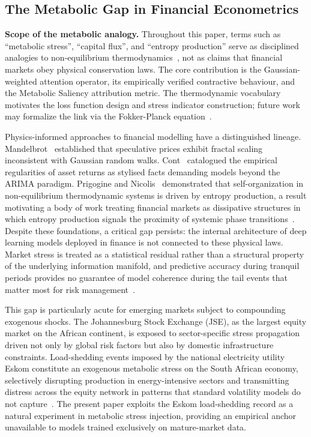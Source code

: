 \documentclass[11pt,a4paper]{article}  %
\theoremstyle{plain}
\theoremstyle{definition}
\theoremstyle{remark}
\begin{document}
\subsection{The Metabolic Gap in Financial Econometrics}
\label{subsec:gap}

\noindent\textbf{Scope of the metabolic analogy.}
Throughout this paper, terms such as ``metabolic stress'',
``capital flux'', and ``entropy production'' serve as disciplined
analogies to non-equilibrium thermodynamics~\cite{Prigogine1977},
not as claims that financial markets obey physical conservation laws.
The core contribution is the Gaussian-weighted attention operator,
its empirically verified contractive behaviour, and the Metabolic
Saliency attribution metric. The thermodynamic vocabulary motivates
the loss function design and stress indicator construction; future
work may formalize the link via the Fokker-Planck
equation~\cite{Risken1989}.

Physics-informed approaches to financial modelling have a distinguished
lineage. Mandelbrot~\cite{Mandelbrot1963} established that speculative
prices exhibit fractal scaling inconsistent with Gaussian random walks.
Cont~\cite{Cont2001} catalogued the empirical regularities of asset
returns as stylised facts demanding models beyond the ARIMA paradigm.
Prigogine and Nicolis~\cite{Prigogine1977} demonstrated that
self-organization in non-equilibrium thermodynamic systems is driven by
entropy production, a result motivating a body of work treating
financial markets as dissipative structures in which entropy production
signals the proximity of systemic phase transitions~\cite{Stanley1999}.
Despite these foundations, a critical gap persists: the internal
architecture of deep learning models deployed in finance is not
connected to these physical laws. Market stress is treated as a
statistical residual rather than a structural property of the
underlying information manifold, and predictive accuracy during
tranquil periods provides no guarantee of model coherence during the
tail events that matter most for risk management~\cite{Taleb2007}.

This gap is particularly acute for emerging markets subject to
compounding exogenous shocks. The Johannesburg Stock Exchange (JSE),
as the largest equity market on the African continent, is exposed to
sector-specific stress propagation driven not only by global risk
factors but also by domestic infrastructure constraints. Load-shedding
events imposed by the national electricity utility Eskom constitute an
exogenous metabolic stress on the South African economy, selectively
disrupting production in energy-intensive sectors and transmitting
distress across the equity network in patterns that standard volatility
models do not capture~\cite{Eberhard2017}. The present paper exploits
the Eskom load-shedding record as a natural experiment in metabolic
stress injection, providing an empirical anchor unavailable to models
trained exclusively on mature-market data.
\end{document}
